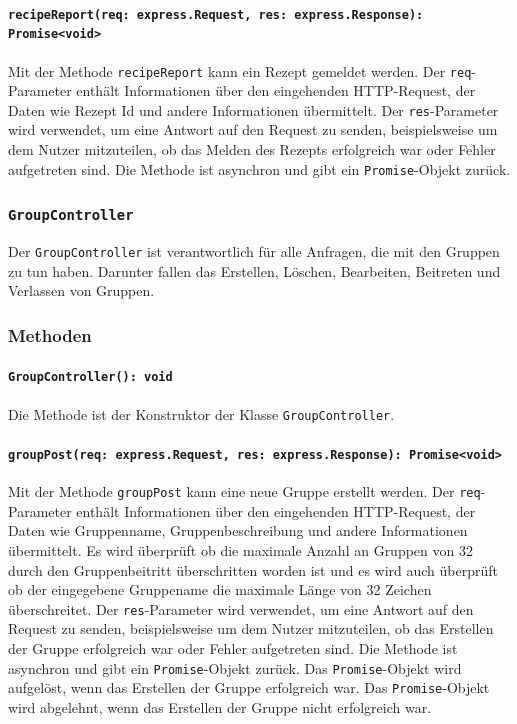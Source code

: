 \documentclass{entwurfsheft}
\begin{document}
\begin{sloppypar}
\paragraph{\texttt{recipeReport(req: express.Request, res: express.Response): Promise<void>\\}}
Mit der Methode \texttt{recipeReport} kann ein Rezept gemeldet werden. Der \texttt{req}-Parameter enthält Informationen über den eingehenden HTTP-Request, der Daten wie Rezept Id und andere Informationen übermittelt. Der \texttt{res}-Parameter wird verwendet, um eine Antwort auf den Request zu senden, beispielsweise um dem Nutzer mitzuteilen, ob das Melden des Rezepts erfolgreich war oder Fehler aufgetreten sind.
Die Methode ist asynchron und gibt ein \texttt{Promise}-Objekt zurück.

\subsubsection{\texttt{GroupController}}\label{sec:GroupController}
Der \texttt{GroupController} ist verantwortlich für alle Anfragen, die mit den Gruppen zu tun haben. Darunter fallen das Erstellen, Löschen, Bearbeiten, Beitreten und Verlassen von Gruppen.
\subsubsection*{Methoden}
\paragraph{\texttt{GroupController(): void}}
Die Methode ist der Konstruktor der Klasse \texttt{GroupController}.
\paragraph{\texttt{groupPost(req: express.Request, res: express.Response): Promise<void>\\}}
Mit der Methode \texttt{groupPost} kann eine neue Gruppe erstellt werden. Der \texttt{req}-Parameter enthält Informationen über den eingehenden HTTP-Request, der Daten wie Gruppenname, Gruppenbeschreibung und andere Informationen übermittelt. Es wird überprüft ob die maximale Anzahl an Gruppen von 32 durch den Gruppenbeitritt überschritten worden ist und es wird auch überprüft ob der eingegebene Gruppename die maximale Länge von 32 Zeichen überschreitet. Der \texttt{res}-Parameter wird verwendet, um eine Antwort auf den Request zu senden, beispielsweise um dem Nutzer mitzuteilen, ob das Erstellen der Gruppe erfolgreich war oder Fehler aufgetreten sind.
Die Methode ist asynchron und gibt ein \texttt{Promise}-Objekt zurück. Das \texttt{Promise}-Objekt wird aufgelöst, wenn das Erstellen der Gruppe erfolgreich war. Das \texttt{Promise}-Objekt wird abgelehnt, wenn das Erstellen der Gruppe nicht erfolgreich war.

\end{sloppypar}
\end{document}
